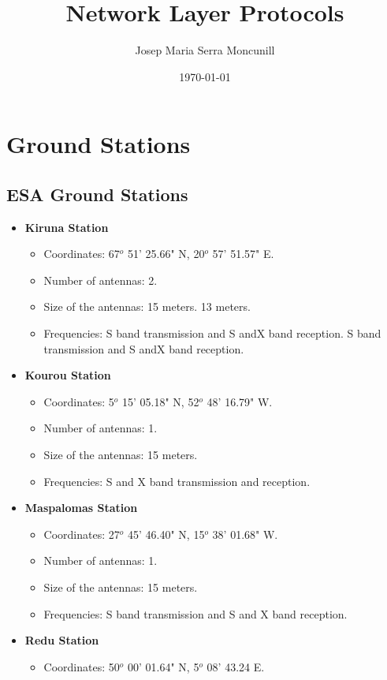 \documentclass[12pt,a4paper]{report}
\author{Josep Maria Serra Moncunill}
\title{Network Layer Protocols}
\date{\today}
\begin{document}
\maketitle
\tableofcontents
\listoffigures
\listoftables

\section{Ground Stations}

\subsection{ESA Ground Stations}

\begin{itemize}
\item \textbf{Kiruna Station}
\begin{itemize}
\item Coordinates: 67$^{o}$ 51' 25.66" N, 20$^{o}$ 57' 51.57" E.
\item Number of antennas: 2.
\item Size of the antennas: 15 meters. 13 meters.
\item Frequencies: S band transmission and S andX band reception. S band transmission and S andX band reception.
\end{itemize}
\item \textbf{Kourou Station}
\begin{itemize}
\item Coordinates: 5$^{o}$ 15' 05.18" N, 52$^{o}$ 48' 16.79" W.
\item Number of antennas: 1.
\item Size of the antennas: 15 meters.
\item Frequencies: S and X band transmission and reception.
\end{itemize}
\item \textbf{Maspalomas Station}
\begin{itemize}
\item Coordinates: 27$^{o}$ 45' 46.40" N, 15$^{o}$ 38' 01.68" W.
\item Number of antennas: 1.
\item Size of the antennas: 15 meters.
\item Frequencies: S band transmission and S and X band reception.
\end{itemize}
\item \textbf{Redu Station}
\begin{itemize}
\item Coordinates: 50$^{o}$ 00' 01.64" N, 5$^{o}$ 08' 43.24 E.

\end{itemize}
\end{itemize}
\end{document}
